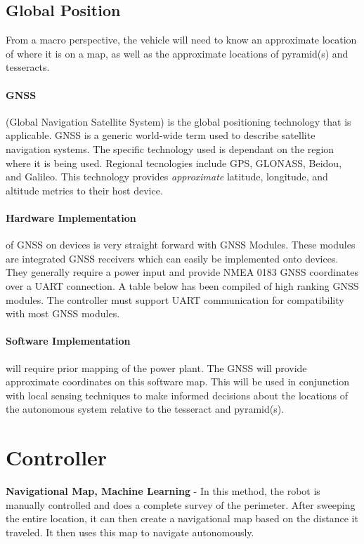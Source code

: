 \documentclass[12pt]{article}
\begin{document}
\subsection{Global Position}
From a macro perspective, the vehicle will need to know an approximate location of where it is on a map, as well as the approximate locations of pyramid(s) and tesseracts. 

\paragraph{GNSS} (Global Navigation Satellite System) is the global positioning technology that is applicable. GNSS is a generic world-wide term used to describe satellite navigation systems. The specific technology used is dependant on the region where it is being used. Regional tecnologies include GPS, GLONASS, Beidou, and Galileo.  This technology provides \textit{approximate} latitude, longitude, and altitude metrics to their host device. 

\paragraph{Hardware Implementation} of GNSS on devices is very straight forward with GNSS Modules. These modules are integrated GNSS receivers which can easily be implemented onto devices. They generally require a power input and provide NMEA 0183 GNSS coordinates over a UART connection. A table below has been compiled of high ranking GNSS modules. The controller must support UART communication for compatibility with most GNSS modules.

\paragraph{Software Implementation} will require prior mapping of the power plant. The GNSS will provide approximate coordinates on this software map. This will be used in conjunction with local sensing techniques to make informed decisions about the locations of the autonomous system relative to the tesseract and pyramid(s).


\section{Controller}

\textbf{Navigational Map, Machine Learning} - In this method, the robot is manually controlled and does a complete survey of the perimeter. After sweeping the entire location, it can then create a navigational map based on the distance it traveled. It then uses this map to navigate autonomously.
\end{document}
